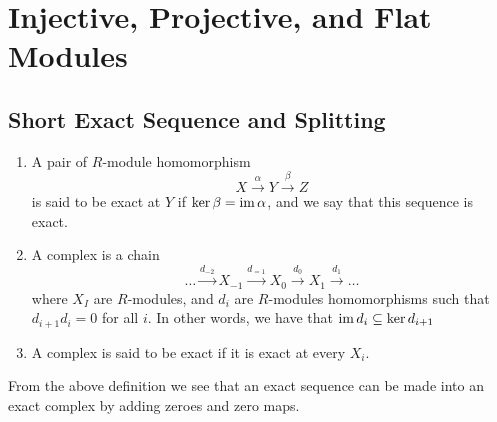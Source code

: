 \newpage

\section{Injective, Projective, and Flat Modules}
\subsection{Short Exact Sequence and Splitting}

\begin{defn} 
    \hfill
    \begin{enumerate}
        \item A pair of $R$-module homomorphism
        \[X\xrightarrow{\alpha}Y\xrightarrow{\beta} Z\]
        is said to be exact at $Y$ if $\ker \beta = \operatorname{im} \alpha$, and we say that this sequence is exact.
        \item A complex is a chain 
        \[\dots \xrightarrow{d_{-2}}X_{-1}\xrightarrow{d_{=1}}X_0 \xrightarrow{d_0}X_1\xrightarrow{d_1}\dots\]
        where $X_I$ are $R$-modules, and $d_i$ are $R$-modules homomorphisms such that $d_{i+1}d_i=0$ for all $i$. In other words, we have that $\operatorname{im} d_i \subseteq \ker d_{i+1}$
        \item A complex is said to be exact if it is exact at every $X_i$.
    \end{enumerate}
\end{defn}

\medskip

\begin{re}
    From the above definition we see that an exact sequence can be made into an exact complex by adding zeroes and zero maps.
\end{re}

\medskip

